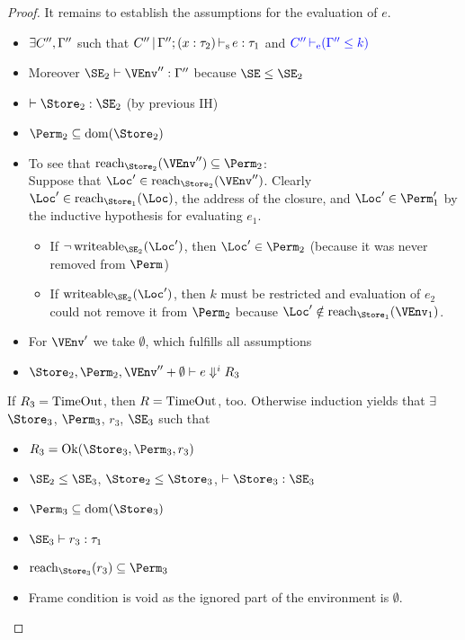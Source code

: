 \begin{proof}
  It remains to establish the assumptions for the evaluation of $e$.
  \begin{itemize}
  \item $\exists C'', \Gamma''$ such that
    $C'' \operatorname{|} \Gamma'';(x : \tau_2) \operatorname{\vdash_s} e : \tau_1$ and
    ${\color{blue}{C'' \operatorname{\vdash_e} (\Gamma'' \leq k)}}$
  \item Moreover $\SE_2 \vdash \VEnv'' : \E''$ because $\SE \le \SE_2$
  \item $\vdash \Store_2 : \SE_2$ \quad (by previous IH)
  \item $\Perm_2 \subseteq \Dom{\Store_2}$
  \item To see that $\Reach{\Store_2}{\VEnv''}\subseteq \Perm_2$:
  \\
  Suppose that $\Loc' \in \Reach{\Store_2}{\VEnv''}$.
  Clearly $\Loc' \in \Reach{\Store_1}{\Loc}$, the address of the
  closure, and $\Loc' \in \Perm_1'$ by the inductive hypothesis for
  evaluating $e_1$.
  \begin{itemize}
  \item If $\neg\Writeable{\SE_2}{\Loc'}$,
    then $\Loc' \in \Perm_2$ (because it was never removed from
    $\Perm$)
  \item If $\Writeable{\SE_2}{\Loc'}$, then $k$ must be restricted and
    evaluation of $e_2$ could not remove it from $\Perm_2$ because
    $\Loc' \notin \Reach{\Store_1}{\VEnv_1}$.
  \end{itemize}
  \item For $\VEnv'$ we take $\emptyset$, which fulfills all assumptions
  \item $\Store_2, \Perm_2, \VEnv'' + \emptyset \vdash {e}\Downarrow^i R_3$
  \end{itemize}
  If $R_3 = \operatorname{TimeOut}$, then $R = \operatorname{TimeOut}$, too.
  Otherwise induction yields that
  $\exists$ $\Store_3$, $\Perm_3$, $r_3$, $\SE_3$ such that
  \begin{itemize}
  \item
    $R_3 = \Ok{\Store_3, \Perm_3, r_3}$  
  \item $\SE_2 \le \SE_3$, $\Store_2 \le \Store_3$,
    $\vdash \Store_3 : \SE_3$ 
  \item $\Perm_3 \subseteq \Dom{\Store_3}$
  \item $\SE_3 \vdash r_3 : \tau_1$
  \item $\Reach{\Store_3}{r_3} \subseteq \Perm_3$
  \item Frame condition is void as the ignored part of the environment
    is $\emptyset$.
  \end{itemize}


\end{proof}
